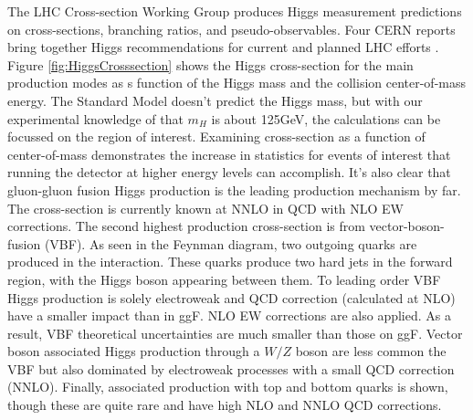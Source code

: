 The LHC Cross-section Working Group produces Higgs measurement predictions on cross-sections, branching ratios, and pseudo-observables. Four CERN reports bring together Higgs recommendations for current and planned LHC efforts \cite{LHCCrossSectionWG}. Figure \ref{fig:HiggsCrosssection} shows the Higgs cross-section for the main production modes as s function of the Higgs mass and the collision center-of-mass energy. The Standard Model doesn't predict the Higgs mass, but with our experimental knowledge of that $m_H$ is about 125GeV, the calculations can be focussed on the region of interest. Examining cross-section as a function of center-of-mass demonstrates the increase in statistics for events of interest that running the detector at higher energy levels can accomplish. It's also clear that gluon-gluon fusion Higgs production is the leading production mechanism by far. The cross-section is currently known at NNLO in QCD with NLO EW corrections. The second highest production cross-section is from vector-boson-fusion (VBF). As seen in the Feynman diagram, two outgoing quarks are produced in the interaction. These quarks produce two hard jets in the forward region, with the Higgs boson appearing between them. To leading order VBF Higgs production is solely electroweak and QCD correction (calculated at NLO) have a smaller impact than in ggF. NLO EW corrections are also applied. As a result, VBF theoretical uncertainties are much smaller than those on ggF. Vector boson associated Higgs production through a $W/Z$ boson are less common the VBF but also dominated by electroweak processes with a small QCD correction (NNLO). Finally, associated production with top and bottom quarks is shown, though these are quite rare and have high NLO and NNLO QCD corrections. 

